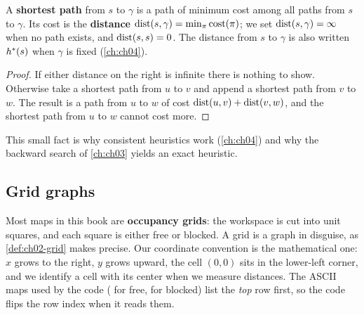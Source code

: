 \begin{definition}
\label{def:ch02-shortest-path}
A \textbf{shortest path} from $s$ to $\gamma$ is a path of minimum cost among all paths from $s$ to $\gamma$. Its cost is the \textbf{distance} $\operatorname{dist}(s,\gamma)=\min_\pi \operatorname{cost}(\pi)$; we set $\operatorname{dist}(s,\gamma)=\infty$ when no path exists, and $\operatorname{dist}(s,s)=0$. The distance from $s$ to $\gamma$ is also written $h^*(s)$ when $\gamma$ is fixed (\cref{ch:ch04}).
\end{definition}

\begin{proof}
If either distance on the right is infinite there is nothing to show. Otherwise take a shortest path from $u$ to $v$ and append a shortest path from $v$ to $w$. The result is a path from $u$ to $w$ of cost $\operatorname{dist}(u,v)+\operatorname{dist}(v,w)$, and the shortest path from $u$ to $w$ cannot cost more. \qedhere
\end{proof}

This small fact is why consistent heuristics work (\cref{ch:ch04}) and why the backward search of \cref{ch:ch03} yields an exact heuristic.

\subsection{Grid graphs}
\label{sec:ch02-grids}

Most maps in this book are \textbf{occupancy grids}: the workspace is cut into unit squares, and each square is either free or blocked. A grid is a graph in disguise, as \cref{def:ch02-grid} makes precise. Our coordinate convention is the mathematical one: $x$ grows to the right, $y$ grows upward, the cell $(0,0)$ sits in the lower-left corner, and we identify a cell with its center when we measure distances. The ASCII maps used by the code ( for free, \code{\#} for blocked) list the \emph{top} row first, so the code flips the row index when it reads them.

